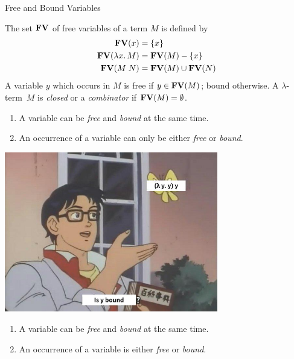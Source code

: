 \begin{frame}{Free and Bound Variables}
\begin{definition}
  The set $\mathbf{FV}$ of free variables of a term $M$ is defined by
  \begin{align*}
    \mathbf{FV}(x) & = \{x\} \\
    \mathbf{FV}(\lambda x.\, M) & = \mathbf{FV}(M) - \{x\} \\
    \mathbf{FV}(M\;N) & = \mathbf{FV}(M) \cup \mathbf{FV}(N)
  \end{align*}
  A variable $y$ which occurs in $M$ is \alert{free} if $y \in \mathbf{FV}(M)$;
  \alert{bound} otherwise. 
  A $\lambda$-term~$M$ is \alert{\emph{closed}} or a \alert{\emph{combinator}}
  if $\mathbf{FV}(M) = \emptyset$. 
\end{definition}
  \begin{enumerate}
    \item A \alert{variable} can be \emph{free} and \emph{bound} at the same
      time. 
    \item An \alert{occurrence} of a variable can only be
      either \emph{free} or \emph{bound}. 
  \end{enumerate}
\end{frame}
\begin{frame}
  \begin{center}
    \includegraphics[height=7cm]{img/e0a.jpg}
  \end{center}
  \begin{enumerate}
    \item A \alert{variable} can be \emph{free} and \emph{bound} at the same
      time. 

    \item An \alert{occurrence} of a variable is either \emph{free} or
      \emph{bound}. 
  \end{enumerate}

\end{frame}
